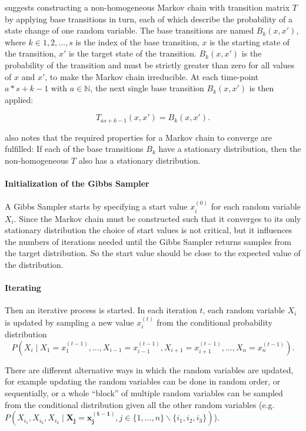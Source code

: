 \cite{Neal1993} suggests constructing a non-homogeneous Markov
chain with transition matrix $T$ by applying base transitions in
turn, each of which describe the probability of a state change of
one random variable. The base transitions are named $B_{k}(x,x')$,
where $k\in1,2,\ldots,s$ is the index of the base transition, $x$
is the starting state of the transition, $x'$ is the target state
of the transition. $B_{k}(x,x')$ is the probability of the transition
and must be strictly greater than zero for all values of $x$ and
$x'$, to make the Markov chain irreducible. At each time-point $a*s+k-1$
with $a\in\mathbf{\mathbb{N}}$, the next single base transition $B_{k}(x,x')$
is then applied:

\[
T_{as+k-1}(x,x')=B_{k}(x,x').
\]

\cite{Neal1993} also notes that the required properties for a Markov
chain to converge are fulfilled: If each of the base transitions $B_{k}$
have a stationary distribution, then the non-homogeneous $T$ also
has a stationary distribution.

\paragraph{Initialization of the Gibbs Sampler}

A Gibbs Sampler starts by specifying a start value $x_{i}^{(0)}$
for each random variable $X_{i}$. Since the Markov chain must be
constructed such that it converges to its only stationary distribution
the choice of start values is not critical, but it influences the
numbers of iterations needed until the Gibbs Sampler returns samples
from the target distribution. So the start value should be close to
the expected value of the distribution.

\paragraph{Iterating}

Then an iterative process is started. In each iteration $t$, each
random variable $X_{i}$ is updated by sampling a new value $x_{i}^{(t)}$
from the conditional probability distribution 
\begin{equation}
P(X_{i}\mid X_{1}=x_{1}^{(t-1)},\dots,X_{i-1}=x_{i-1}^{(t-1)},X_{i+1}=x_{i+1}^{(t-1)},\dots,X_{n}=x_{n}^{(t-1)}).\label{eq:Gibbs sampling: CPD}
\end{equation}

There are different alternative ways in which the random variables
are updated, for example updating the random variables can be done
in random order, or sequentially, or a whole ``block'' of multiple
random variables can be sampled from the conditional distribution
given all the other random variables (e.g. $P(X_{i_{1}},X_{i_{2}},X_{i_{3}}\mid\mathbf{X_{j}=x_{j}^{(t-1)}},j\in\{1,\dots,n\}\backslash\{i_{1},i_{2},i_{3}\})$).

